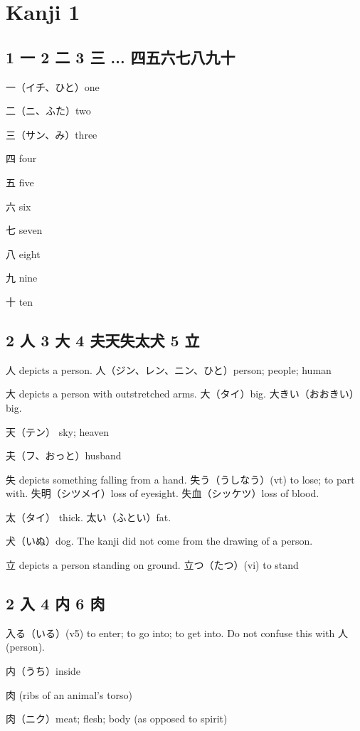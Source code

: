 \chapter{Kanji 1}

\section{1 一 2 二 3 三 ... 四五六七八九十}

一（イチ、ひと）one

二（ニ、ふた）two

三（サン、み）three

四 four

五 five

六 six

七 seven

八 eight

九 nine

十 ten

\section{2 人 3 大 4 夫天失太犬 5 立}

人 depicts a person.
人（ジン、レン、ニン、ひと）person; people; human

大 depicts a person with outstretched arms.
大（タイ）big.
大きい（おおきい）big.

天（テン） sky; heaven

夫（フ、おっと）husband

失 depicts something falling from a hand.
失う（うしなう）(vt) to lose; to part with.
失明（シツメイ）loss of eyesight.
失血（シッケツ）loss of blood.

太（タイ） thick.
太い（ふとい）fat.

犬（いぬ）dog.
The kanji did not come
from the drawing of a person.

立 depicts a person standing on ground.
立つ（たつ）(vi) to stand

\section{2 入 4 内 6 肉}

入る（いる）(v5)
to enter; to go into; to get into.
Do not confuse this with 人(person).

内（うち）inside

肉 (ribs of an animal's torso)

肉（ニク）meat; flesh; body (as opposed to spirit)


